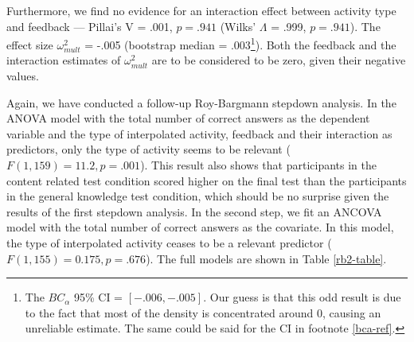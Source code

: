 \documentclass[11pt,]{article}
\let\rmarkdownfootnote\footnote%
\def\footnote{\protect\rmarkdownfootnote}
\begin{document}
Furthermore, we find no evidence for an interaction effect between
activity type and feedback --- Pillai's V = .001, \(p = .941\) (Wilks'
\(\Lambda\) = .999, \(p = .941\)). The effect size \(\omega^2_{mult}\) =
-.005 (bootstrap median = .003\footnote{
The \(BC_\alpha\) 95\% CI = \([-.006,
-.005]\).
Our guess is that this odd result is due to the fact that most of the density is concentrated
around 0, causing an unreliable estimate. The same could be said for the CI in
footnote \ref{bca-ref}.}). Both the feedback and the interaction
estimates of \(\omega^2_{mult}\) are to be considered to be zero, given
their negative values.

Again, we have conducted a follow-up Roy-Bargmann stepdown analysis. In
the ANOVA model with the total number of correct answers as the
dependent variable and the type of interpolated activity, feedback and
their interaction as predictors, only the type of activity seems to be
relevant (\(F(1, 159) = 11.2, p = .001\)). This result also shows that
participants in the content related test condition scored higher on the
final test than the participants in the general knowledge test
condition, which should be no surprise given the results of the first
stepdown analysis. In the second step, we fit an ANCOVA model with the
total number of correct answers as the covariate. In this model, the
type of interpolated activity ceases to be a relevant predictor
(\(F(1, 155) = 0.175, p = .676\)). The full models are shown in Table
\ref{rb2-table}.
\end{document}
